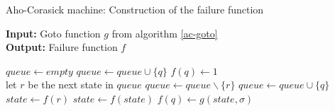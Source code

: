 \documentclass[english,twoside,censored,csm,algorithms-track-2020]{HYthesisML}
\theoremstyle{plain}
\theoremstyle{definition}
\begin{document}
  \begin{algorithm}[]

    \caption{Aho-Corasick machine: Construction of the failure function} \label{ac-fail}
    \hspace*{\algorithmicindent} \textbf{Input:} Goto function $g$ from algorithm \ref{ac-goto}\\
    \hspace*{\algorithmicindent} \textbf{Output:} Failure function $f$

    \begin{algorithmic}[1]
        \State $queue\gets \textit{empty}$
          \State $queue\gets queue \cup \{q\}$
          \State $f(q)\gets 1$
        \EndFor
        \\
          \hspace*{1.2cm plus \algorithmicindent}let $r$ be the next state in $queue$
          \State $queue\gets queue \backslash \{r\}$
            \State $queue\gets queue \cup \{q\}$
            \State $state\gets f(r)$
              \State $state\gets f(state)$
            \EndWhile
            \State $f(q)\gets g(state,\sigma)$              
          \EndFor
        \EndWhile
          
      \EndFunction

    \end{algorithmic}
  \end{algorithm}
\end{document}
